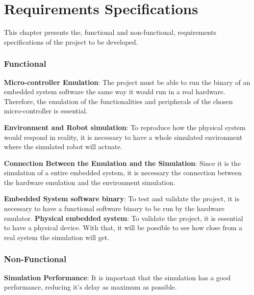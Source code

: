\documentclass[../monografia.tex]{subfiles}
\begin{document}
\part{Requirements Specifications}
This chapter presents the, functional and non-functional, requirements specifications of the project to be developed. 
\section{Functional}
\textbf{Micro-controller Emulation}: The project must be able to run the binary of an embedded system software the same way it would run in a real hardware. Therefore, the emulation of the functionalities and peripherals of the chosen micro-controller is essential.

\textbf{Environment and Robot simulation}: To reproduce how the physical system would respond in reality, it is necessary to have a whole simulated environment where the simulated robot will actuate.

\textbf{Connection Between the Emulation and the Simulation}: Since it is the simulation of a entire embedded system, it is necessary the connection between the hardware emulation and the environment simulation.

\textbf{Embedded System software binary}: To test and validate the project, it is necessary to have a functional software binary to be run by the hardware emulator.
\textbf{Physical embedded system}: To validate the project, it is essential to have a physical device. With that, it will be possible to see how close from a real system the simulation will get.

\section{Non-Functional}
\textbf{Simulation Performance}: It is important that the simulation has a good performance, reducing it's delay as maximum as possible.
\end{document}
